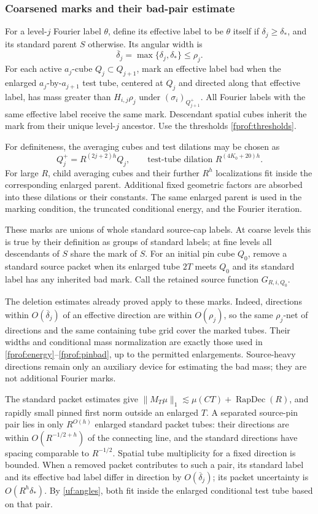 \subsubsection*{Coarsened marks and their bad-pair estimate}

For a level-\(j\) Fourier label \(\theta\), define its effective label
to be \(\theta\) itself if \(\delta_j\geq\delta_*\), and its standard
parent \(S\) otherwise. Its angular width is
$$
 \overline\delta_j=\max\{\delta_j,\delta_*\}\leq\rho_j.
$$
For each active \(a_j\)-cube \(Q_j\subset Q_{j+1}\), mark an effective
label bad when the enlarged \(a_j\)-by-\(a_{j+1}\) test tube, centered
at \(Q_j\) and directed along that effective label, has mass greater than
\(H_{i,j}\rho_j\) under \((\sigma_i)_{Q_{j+1}^+}\).
All Fourier labels with the same effective label receive the same mark.
Descendant spatial cubes inherit the mark from their unique level-\(j\)
ancestor. Use the thresholds \eqref{fprof:thresholds}.

For definiteness, the averaging cubes and test dilations may be chosen as
$$
 Q_j^+=R^{(2j+2)h}Q_j,
 \qquad\text{test-tube dilation }R^{(4K_0+20)h}.
$$
For large \(R\), child averaging cubes and their further \(R^h\)
localizations fit inside the corresponding enlarged parent. Additional
fixed geometric factors are absorbed into these dilations or their
constants. The same enlarged parent is used in the marking condition,
the truncated conditional energy, and the Fourier iteration.

These marks are unions of whole standard source-cap labels. At coarse
levels this is true by their definition as groups of standard labels;
at fine levels all descendants of \(S\) share the mark of \(S\).
For an initial pin cube \(Q_0\), remove a standard source packet when
its enlarged tube \(2T\) meets \(Q_0\) and its standard label has any
inherited bad mark. Call the retained source function \(G_{R,i,Q_0}\).

The deletion estimates already proved apply to these marks. Indeed,
directions within \(O(\overline\delta_j)\) of an effective direction
are within \(O(\rho_j)\), so the same \(\rho_j\)-net of directions
and the same containing tube grid cover the marked tubes. Their widths
and conditional mass normalization are exactly those used in
\eqref{fprof:energy}--\eqref{fprof:pinbad}, up to the permitted
enlargements. Source-heavy directions remain only an auxiliary device
for estimating the bad mass; they are not additional Fourier marks.

The standard packet estimates give
\(\|M_T\mu\|_1\lesssim\mu(CT)+\operatorname{RapDec}(R)\),
and rapidly small pinned first norm outside an enlarged \(T\).
A separated source-pin pair lies in only \(R^{O(h)}\) enlarged
standard packet tubes: their directions are within
\(O(R^{-1/2+h})\) of the connecting line, and the standard directions
have spacing comparable to \(R^{-1/2}\). Spatial tube multiplicity
for a fixed direction is bounded. When a removed packet contributes to
such a pair, its standard label and its effective bad label differ in
direction by \(O(\overline\delta_j)\); its packet uncertainty is
\(O(R^h\delta_*)\). By \eqref{uf:angles}, both fit inside the enlarged
conditional test tube based on that pair.

